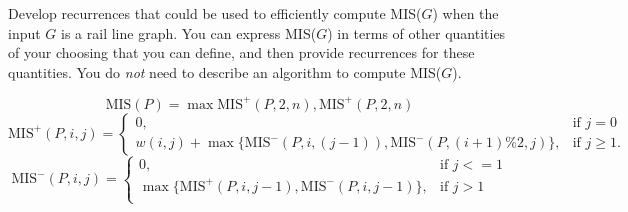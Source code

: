 \documentclass[11pt]{article}
\def\question#1{\red{#1}}
\def\soln#1{\par\blu{#1}} %
\def\blu#1{{\color{blu}#1}}
\def\red#1{{\color{red}#1}}
\begin{document}
\question{Develop recurrences that could be used to efficiently compute MIS($G$) when the input $G$ is a rail line graph.} You
can express MIS($G$) in terms of other quantities of your
choosing that you can define, and then provide recurrences for these quantities.
You do \emph{not} need to describe an algorithm to compute MIS($G$).
\soln{
\[
  \mbox{MIS}(P) = \max{\mbox{MIS}^+(P,2,n) , \mbox{MIS}^+(P,2,n)}
\]
\[
\mbox{MIS}^+(P,i,j) = \left \{\begin{array}{ll}
                   0, & \mbox{if } j = 0 \\
                   w(i,j) + \max \{ \mbox{MIS}^-(P,i,(j-1)), \mbox{MIS}^-(P,(i+1)\%2, j) \}, & \mbox{if } j \ge 1.
                   \end{array} \right.
\]
\[
\mbox{MIS}^-(P,i,j) = \left \{\begin{array}{ll}
                0, & \mbox{if } j <= 1 \\[.3in]
                \max \{ \mbox{MIS}^+(P,i,j-1), \mbox{MIS}^-(P,i,j-1) \}, & \mbox{if } j > 1 \\
                \end{array} \right.
\]
}
\end{document}
